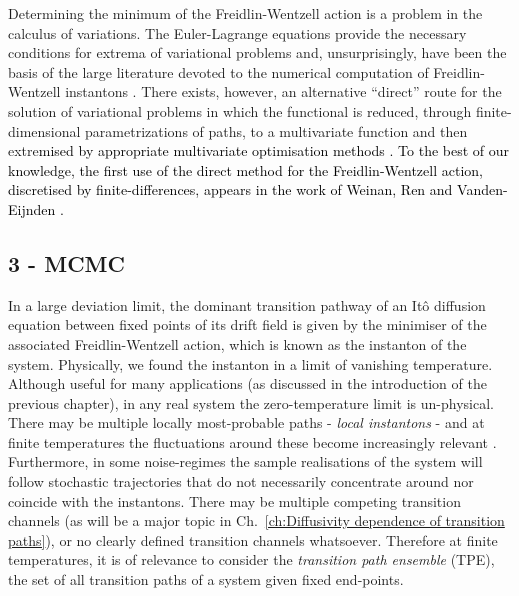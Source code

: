 \documentclass[withindex,glossary,techreport]{cam-thesis}
\begin{document}
Determining the minimum of the Freidlin-Wentzell action is a problem
in the calculus of variations. The Euler-Lagrange equations provide
the necessary conditions for extrema of variational problems and,
unsurprisingly, have been the basis of the large literature devoted
to the numerical computation of Freidlin-Wentzell instantons \citep{weinan2002string,paninski2006most,heymann2008geometric,grafke2017long}.
There exists, however, an alternative ``direct'' route for the solution
of variational problems in which the functional is reduced, through
finite-dimensional parametrizations of paths, to a multivariate function
and then extre\textcolor{black}{mised by appropriate multivariate
optimisation methods \citep{gelfand2012calculus,kantorovich1958approximate}.
To the best of our knowledge, the first use of the direct method for
the Freidlin-Wentzell action, discretised by finite-differences, appears
in the work of Weinan, Ren and Vanden-Eijnden \citep{weinan2004minimum}.} 

\subsection{3 - MCMC}

In a large deviation limit, the dominant transition pathway of an Itô diffusion equation between fixed points of its drift field is given by the minimiser of the associated Freidlin-Wentzell action, which is known as the instanton of the system. Physically, we found the instanton in a limit of vanishing temperature. Although useful for many applications (as discussed in the introduction of the previous chapter), in any real system the zero-temperature limit is un-physical. There may be multiple locally most-probable paths - \textit{local instantons} - and at finite temperatures the fluctuations around these become increasingly relevant \citep{gelfandIntegrationFunctionalSpaces1960, nickelsenNoiseCorrectionLarge2022, corazzaNormalizedGaussianPath2020b, luGaussianApproximationsTransition2017a}. Furthermore, in some noise-regimes the sample realisations of the system will follow stochastic trajectories that do not necessarily concentrate around nor coincide with the instantons. There may be multiple competing transition channels (as will be a major topic in Ch.~\ref{ch:Diffusivity dependence of transition paths}), or no clearly defined transition channels whatsoever. Therefore at finite temperatures, it is of relevance to consider the \textit{transition path ensemble} (TPE), the set of all transition paths of a system given fixed end-points.
\end{document}

